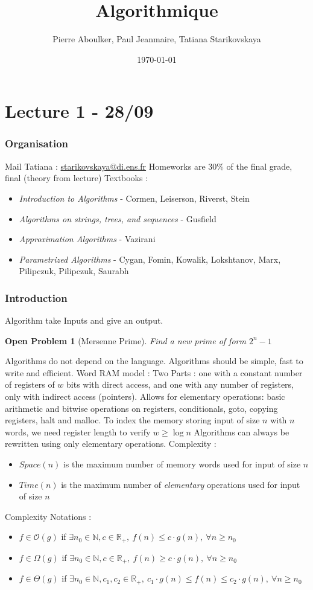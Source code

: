 \documentclass{cours}
\title{Algorithmique}
\author{Pierre Aboulker, Paul Jeanmaire, Tatiana Starikovskaya}
\date{\today}
\newtheorem{openpb}{Open Problem}
\begin{document}
\part[First Algorithms]{Lecture 1 - 28/09}
\localtableofcontents
\section{Organisation}
Mail Tatiana : \url{starikovskaya@di.ens.fr}
Homeworks are 30\% of the final grade, final (theory from lecture)
Textbooks : 
\begin{itemize}
    \item \textsl{Introduction to Algorithms} - Cormen, Leiserson, Riverst, Stein
    \item \textsl{Algorithms on strings, trees, and sequences} - Gusfield
    \item \textsl{Approximation Algorithms} - Vazirani
    \item \textsl{Parametrized Algorithms} - Cygan, Fomin, Kowalik, Lokshtanov, Marx, Pilipczuk, Pilipczuk, Saurabh
\end{itemize}

\section{Introduction}
Algorithm take Inputs and give an output.
\begin{openpb}[Mersenne Prime]
    Find a new prime of form $2^{n} - 1$
\end{openpb}
Algorithms do not depend on the language. Algorithms should be simple, fast to write and efficient.
Word RAM model : Two Parts : one with a constant number of registers of $w$ bits with direct access, and one with any number of registers, only with indirect access (pointers). 
Allows for elementary operations: basic arithmetic and bitwise operations on registers, conditionals, goto, copying registers, halt and malloc. 
To index the memory storing input of size $n$ with $n$ words, we need register length to verify $w \geq \log n$
Algorithms can always be rewritten using only elementary operations. 
Complexity : 
\begin{itemize}
    \item $Space(n)$ is the maximum number of memory words used for input of size $n$
    \item $Time(n)$ is the maximum number of \textsl{elementary} operations used for input of size $n$
\end{itemize}
Complexity Notations : 
\begin{itemize}
    \item $f \in \mathcal{O}(g)$ if $\exists n_0 \in \mathbb{N}, c \in \mathbb{R}_{+},\ f(n) \leq c \cdot g(n), \ \forall n \geq n_0$
    \item $f \in \Omega(g)$ if $\exists n_0 \in \mathbb{N}, c \in \mathbb{R}_{+},\ f(n) \geq c \cdot g(n), \ \forall n \geq n_0$
    \item $f \in \Theta(g)$ if $\exists n_0 \in \mathbb{N}, c_{1}, c_{2} \in \mathbb{R}_{+},\ c_{1} \cdot g(n) \leq f(n) \leq c_{2} \cdot g(n), \ \forall n \geq n_0$
\end{itemize}
\end{document}
